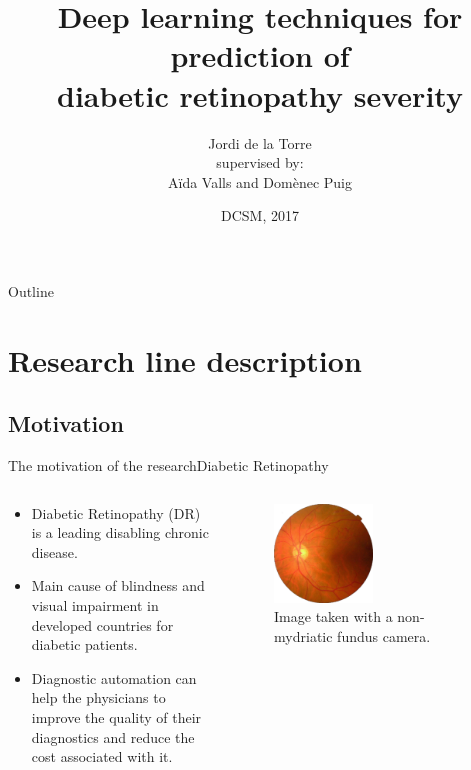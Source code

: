 \documentclass{beamer}
\title{Deep learning techniques for prediction of\\ diabetic retinopathy severity}
\author{Jordi de la Torre\inst{1} \\supervised by:\\ A\"ida Valls\inst{1} and Dom\`enec Puig\inst{1}} %
\institute[Universitat Rovira i Virgili] %
{
  \inst{1}%
  Department d'Enginyeria Inform\`atica i Matem\`atiques\\
  Escola T\`ecnica Superior d'Enginyeria\\
  Universitat Rovira i Virgili}
\date{DCSM, 2017}
\begin{document}
\begin{frame}
  \titlepage
\end{frame}

\begin{frame}{Outline}
  \tableofcontents
\end{frame}

\section{Research line description}

\subsection{Motivation}

\begin{frame}{The motivation of the research}{Diabetic Retinopathy}
\begin{columns}
	\begin{column}{0.5\textwidth}
		\begin{itemize}
	  	 	\item {Diabetic Retinopathy (DR) is a leading disabling chronic disease.}
	  	 	\item {Main cause of blindness and visual impairment in developed countries for diabetic patients.}
	  	 	\item{Diagnostic automation can help the physicians to improve the quality of their diagnostics and reduce the cost associated with it.}
	  	\end{itemize}	
	\end{column}
	\begin{column}{0.5\textwidth}  %
		\begin{figure}[p]
			\centering
			\includegraphics[width=0.5\textwidth]{retine.eps}
			\caption{Image taken with a non-mydriatic fundus camera.}
		\end{figure}
	\end{column}
\end{columns}

\end{frame}
\end{document}
